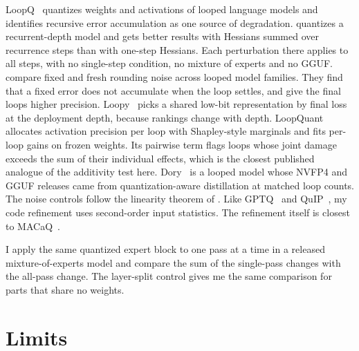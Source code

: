 \documentclass[11pt,a4paper]{article}
\begin{document}
LoopQ~\citep{loopq} quantizes weights and activations of looped language models and identifies recursive error accumulation as one source of degradation. \citet{feedback} quantizes a recurrent-depth model and gets better results with Hessians summed over recurrence steps than with one-step Hessians. Each perturbation there applies to all steps, with no single-step condition, no mixture of experts and no GGUF. \citet{tiltedbowl} compare fixed and fresh rounding noise across looped model families. They find that a fixed error does not accumulate when the loop settles, and give the final loops higher precision. Loopy~\citep{loopy} picks a shared low-bit representation by final loss at the deployment depth, because rankings change with depth. LoopQuant~\citep{loopquant} allocates activation precision per loop with Shapley-style marginals and fits per-loop gains on frozen weights. Its pairwise term flags loops whose joint damage exceeds the sum of their individual effects, which is the closest published analogue of the additivity test here. Dory~\citep{dory} is a looped model whose NVFP4 and GGUF releases came from quantization-aware distillation at matched loop counts. The noise controls follow the linearity theorem of \citet{linearity}. Like GPTQ~\citep{gptq} and QuIP~\citep{quip}, my code refinement uses second-order input statistics. The refinement itself is closest to MACaQ~\citep{macaq}.

I apply the same quantized expert block to one pass at a time in a released mixture-of-experts model and compare the sum of the single-pass changes with the all-pass change. The layer-split control gives me the same comparison for parts that share no weights.

\section{Limits}
\end{document}
